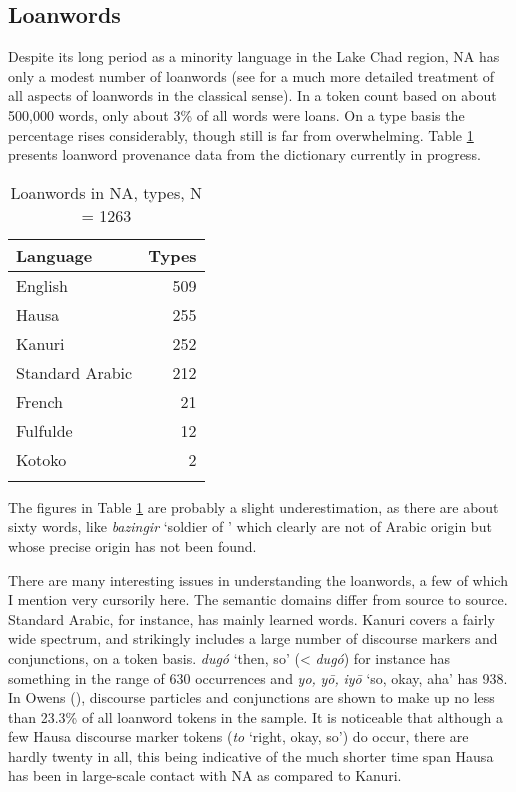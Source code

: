 \documentclass[output=paper]{langsci/langscibook}
\begin{document}
\subsection{Loanwords}\label{loans}

Despite its long period as a minority language in the Lake Chad region, NA has only a modest number of loanwords (see \citealt{Owens2000article} for a much more detailed treatment of all aspects of loanwords in the classical sense). In a token count based on about 500,000 words, only about 3\% of all words were loans. On a type basis the percentage rises considerably, though still is far from overwhelming. Table \ref{1} presents loanword provenance data from the dictionary currently in progress.

\begin{table}
\begin{tabularx}{.5\textwidth}{Xr}
\lsptoprule
Language & Types\\
\midrule
English & 509 \\
Hausa & 255 \\ 
Kanuri & 252\\
Standard Arabic & 212\\
French & 21 \\
Fulfulde & 12 \\
Kotoko & 2 \\
\lspbottomrule
\end{tabularx}
\caption{Loanwords in NA, types, N = 1263}
\label{1}
\end{table}

The figures in Table \ref{1} are probably a slight underestimation, as there are about sixty words, like \textit{bazingir} ‘soldier of ’ which clearly are not of Arabic origin but whose precise origin has not been found.

There are many interesting issues in understanding the loanwords, a few of which I mention very cursorily here. The semantic domains differ from source to source. Standard Arabic, for instance, has mainly learned words. Kanuri covers a fairly wide spectrum, and strikingly includes a large number of discourse markers and conjunctions, on a token basis. \textit{dugó} ‘then, so’ (< \textit{dugó}) for instance has something in the range of 630 occurrences and \textit{yo,} \textit{yō,} \textit{iyō} ‘so, okay, aha’ has 938. In Owens (\citeyear[303]{Owens2000article}), discourse particles and conjunctions are shown to make up no less than 23.3\% of all loanword tokens in the sample. It is noticeable that although a few Hausa discourse marker tokens (\textit{to} ‘right, okay, so’) do occur, there are hardly twenty in all, this being indicative of the much shorter time span Hausa has been in large-scale contact with NA as compared to Kanuri.
\end{document}
